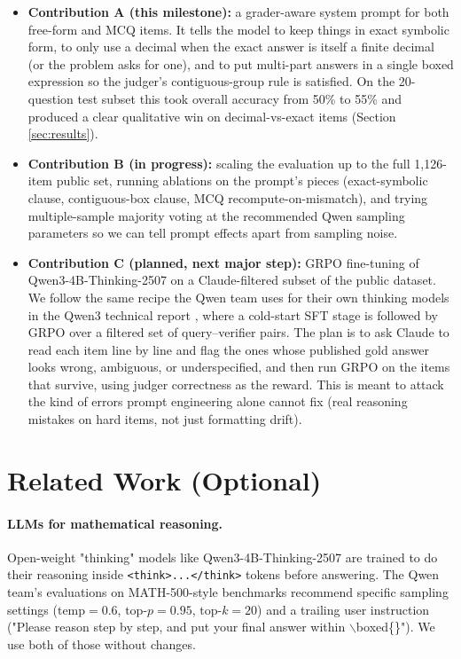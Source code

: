 \documentclass{article}
\begin{document}
\begin{itemize}
  \item \textbf{Contribution A (this milestone):} a grader-aware
  system prompt for both free-form and MCQ items. It tells the model
  to keep things in exact symbolic form, to only use a decimal when
  the exact answer is itself a finite decimal (or the problem asks
  for one), and to put multi-part answers in a single
  boxed expression so the judger's contiguous-group rule is
  satisfied. On the 20-question test subset this took overall
  accuracy from 50\% to 55\% and produced a clear qualitative
  win on decimal-vs-exact items (Section \ref{sec:results}).
  \item \textbf{Contribution B (in progress):} scaling the
  evaluation up to the full 1{,}126-item public set, running
  ablations on the prompt's pieces (exact-symbolic clause,
  contiguous-box clause, MCQ recompute-on-mismatch), and trying
  multiple-sample majority voting at the recommended Qwen sampling
  parameters so we can tell prompt effects apart from sampling noise.
  \item \textbf{Contribution C (planned, next major step):} GRPO
  \citep{shao2024deepseekmath} fine-tuning of Qwen3-4B-Thinking-2507
  on a Claude-filtered subset of the public dataset. We follow the
  same recipe the Qwen team uses for their own thinking models in
  the Qwen3 technical report \citep{qwen3technicalreport}, where a
  cold-start SFT stage is followed by GRPO over a filtered set of
  query--verifier pairs. The plan is to ask Claude to read each
  item line by line and flag the ones whose published gold answer
  looks wrong, ambiguous, or underspecified, and then run GRPO on
  the items that survive, using judger correctness as the reward.
  This is meant to attack the kind of errors prompt engineering
  alone cannot fix (real reasoning mistakes on hard items, not
  just formatting drift).
\end{itemize}


\section{Related Work (Optional)}
\label{sec:relatedwork}

\paragraph{LLMs for  mathematical reasoning.}
Open-weight "thinking" models like Qwen3-4B-Thinking-2507
\citep{qwen3technicalreport} are trained to do their reasoning
inside \texttt{<think>...</think>} tokens before answering. The
Qwen team's evaluations on MATH-500-style benchmarks recommend
specific sampling settings ($\text{temp}=0.6$, $\text{top-}p=0.95$,
$\text{top-}k=20$) and a trailing user instruction ("Please reason
step by step, and put your final answer within $\backslash$boxed\{\}").
We use both of those without changes.
\end{document}
